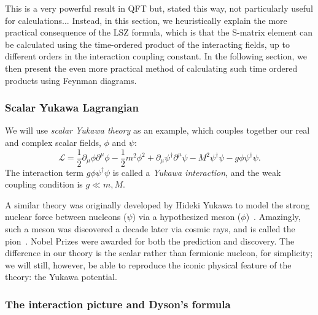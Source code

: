 This is a very powerful result in QFT but, stated this way, not particularly useful for calculations...
Instead, in this section, we heuristically explain the more practical consequence of the LSZ formula, which is that the S-matrix element can be calculated using the time-ordered product of the interacting fields, up to different orders in the interaction coupling constant.
In the following section, we then present the even more practical method of calculating such time ordered products using Feynman diagrams.


\subsubsection{Scalar Yukawa Lagrangian}

We will use \textit{scalar Yukawa theory} as an example, which couples together our real and complex scalar fields, $\phi$ and $\psi$:
\begin{equation}
	\label{eq:01_qft_interactions_yukawa}
	\mathcal L = \frac{1}{2}\partial_\mu\phi\partial^\mu\phi - \frac{1}{2}m^2\phi^2 + \partial_\mu\psi^\dagger\partial^\mu\psi - M^2\psi^\dagger\psi - g\phi\psi^\dagger\psi.
\end{equation}
The interaction term $g\phi\psi^\dagger\psi$ is called a \textit{Yukawa interaction}, and the weak coupling condition is $g \ll m, M$.

A similar theory was originally developed by Hideki Yukawa to model the strong nuclear force between nucleons ($\psi$) via a hypothesized meson ($\phi$)~\cite{Yukawa:1935xg}.
Amazingly, such a meson was discovered a decade later via cosmic rays, and is called the pion~\cite{Lattes:1947mw}.
Nobel Prizes were awarded for both the prediction and discovery.
The difference in our theory is the scalar rather than fermionic nucleon, for simplicity; we will still, however, be able to reproduce the iconic physical feature of the theory: the Yukawa potential.


\subsubsection{The interaction picture and Dyson's formula}

